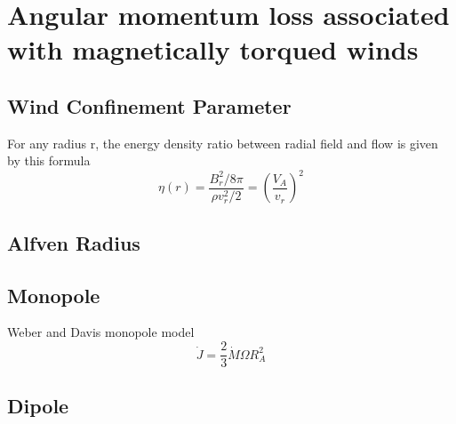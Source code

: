 \section{Angular momentum loss associated with magnetically torqued winds}
\subsection{Wind Confinement Parameter}
For any radius r, the energy density ratio between radial field and flow is given by this formula
\begin{equation}
\eta(r)=\frac{B_r^2/8\pi}{\rho v_r^2/2}=(\frac{V_A}{v_r})^2
\end{equation}

\subsection{Alfven Radius}

\subsection{Monopole}
Weber and Davis monopole model
\begin{equation}
\dot{J}=\frac{2}{3}\dot{M}\Omega R_A^2
\end{equation}
\subsection{Dipole}
